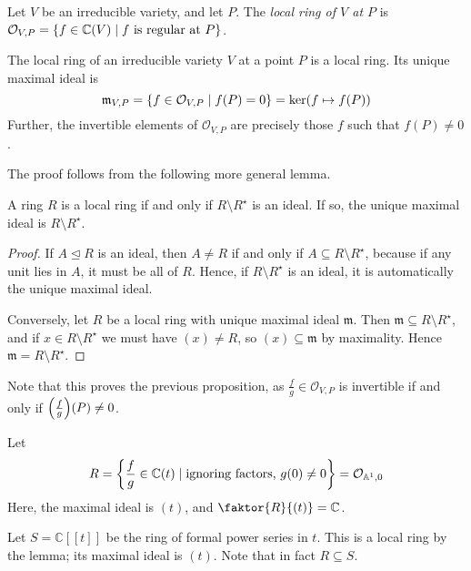 \begin{definition}
    Let \( V \) be an irreducible variety, and let \( P \).
    The \emph{local ring of \( V \) at \( P \)} is \( \mathcal O_{V,P} = \qty{f \in \mathbb C(V) \mid f \text{ is regular at } P} \).
\end{definition}
\begin{proposition}
    The local ring of an irreducible variety \( V \) at a point \( P \) is a local ring.
    Its unique maximal ideal is
    \[ \mathfrak m_{V,P} = \qty{f \in \mathcal O_{V,P} \mid f(P) = 0} = \ker (f \mapsto f(P)) \]
    Further, the invertible elements of \( \mathcal O_{V,P} \) are precisely those \( f \) such that \( f(P) \neq 0 \).
\end{proposition}
The proof follows from the following more general lemma.
\begin{lemma}
    A ring \( R \) is a local ring if and only if \( R \setminus R^\star \) is an ideal.
    If so, the unique maximal ideal is \( R \setminus R^\star \).
\end{lemma}
\begin{proof}
    If \( A \trianglelefteq R \) is an ideal, then \( A \neq R \) if and only if \( A \subseteq R \setminus R^\star \), because if any unit lies in \( A \), it must be all of \( R \).
    Hence, if \( R \setminus R^\star \) is an ideal, it is automatically the unique maximal ideal.

    Conversely, let \( R \) be a local ring with unique maximal ideal \( \mathfrak m \).
    Then \( \mathfrak m \subseteq R \setminus R^\star \), and if \( x \in R \setminus R^\star \) we must have \( (x) \neq R \), so \( (x) \subseteq \mathfrak m \) by maximality.
    Hence \( \mathfrak m = R \setminus R^\star \).
\end{proof}
Note that this proves the previous proposition, as \( \frac{f}{g} \in \mathcal O_{V,P} \) is invertible if and only if \( \qty(\frac{f}{g})(P) \neq 0 \).
\begin{example}
    Let
    \[ R = \qty{\frac{f}{g} \in \mathbb C(t) \mid \text{ignoring factors, } g(0) \neq 0} = \mathcal O_{\mathbb A^1, 0} \]
    Here, the maximal ideal is \( (t) \), and \( \faktor{R}{(t)} = \mathbb C \).

    Let \( S = \mathbb C[\![t]\!] \) be the ring of formal power series in \( t \).
    This is a local ring by the lemma; its maximal ideal is \( (t) \).
    Note that in fact \( R \subseteq S \).
\end{example}
